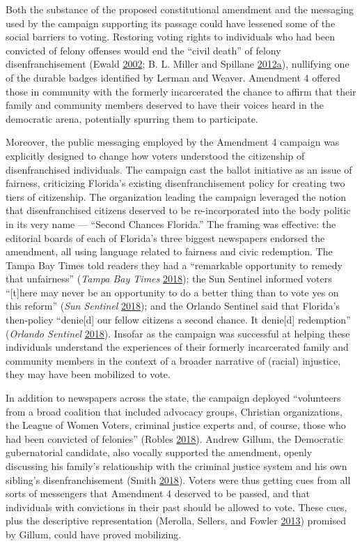 \documentclass[
  12pt,
]{article}
\begin{document}
Both the substance of the proposed constitutional amendment and the messaging used by the campaign supporting its passage could have lessened some of the social barriers to voting. Restoring voting rights to individuals who had been convicted of felony offenses would end the ``civil death'' of felony disenfranchisement (Ewald \protect\hyperlink{ref-Ewald2002}{2002}; B. L. Miller and Spillane \protect\hyperlink{ref-Miller2012}{2012}\protect\hyperlink{ref-Miller2012}{a}), nullifying one of the durable badges identified by Lerman and Weaver. Amendment 4 offered those in community with the formerly incarcerated the chance to affirm that their family and community members deserved to have their voices heard in the democratic arena, potentially spurring them to participate.

Moreover, the public messaging employed by the Amendment 4 campaign was explicitly designed to change how voters understood the citizenship of disenfranchised individuals. The campaign cast the ballot initiative as an issue of fairness, criticizing Florida's existing disenfranchisement policy for creating two tiers of citizenship. The organization leading the campaign leveraged the notion that disenfranchised citizens deserved to be re-incorporated into the body politic in its very name --- ``Second Chances Florida.'' The framing was effective: the editorial boards of each of Florida's three biggest newspapers endorsed the amendment, all using language related to fairness and civic redemption. The Tampa Bay Times told readers they had a ``remarkable opportunity to remedy that unfairness'' (\emph{Tampa Bay Times} \protect\hyperlink{ref-tampabaytimes2018}{2018}); the Sun Sentinel informed voters ``{[}t{]}here may never be an opportunity to do a better thing than to vote yes on this reform'' (\emph{Sun Sentinel} \protect\hyperlink{ref-SunSentinelEditorial2018}{2018}); and the Orlando Sentinel said that Florida's then-policy ``denie{[}d{]} our fellow citizens a second chance. It denie{[}d{]} redemption'' (\emph{Orlando Sentinel} \protect\hyperlink{ref-ORLANDOSENTINEL2018}{2018}). Insofar as the campaign was successful at helping these individuals understand the experiences of their formerly incarcerated family and community members in the context of a broader narrative of (racial) injustice, they may have been mobilized to vote.

In addition to newspapers across the state, the campaign deployed ``volunteers from a broad coalition that included advocacy groups, Christian organizations, the League of Women Voters, criminal justice experts and, of course, those who had been convicted of felonies'' (Robles \protect\hyperlink{ref-Robles2018}{2018}). Andrew Gillum, the Democratic gubernatorial candidate, also vocally supported the amendment, openly discussing his family's relationship with the criminal justice system and his own sibling's disenfranchisement (Smith \protect\hyperlink{ref-Smith2018}{2018}). Voters were thus getting cues from all sorts of messengers that Amendment 4 deserved to be passed, and that individuals with convictions in their past should be allowed to vote. These cues, plus the descriptive representation (Merolla, Sellers, and Fowler \protect\hyperlink{ref-Merolla2013}{2013}) promised by Gillum, could have proved mobilizing.
\end{document}
